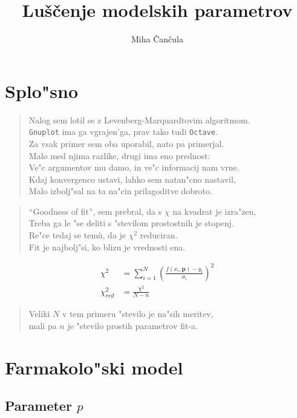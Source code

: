 \documentclass[a4paper,10pt]{article}
\title{Lu\v s\v cenje modelskih parametrov}
\author{Miha \v Can\v cula}
\begin{document}
\maketitle

\section{Splo"sno}
\begin{verse}
Nalog sem lotil se z Levenberg-Marquardtovim algoritmom. \\
\texttt{Gnuplot} ima ga vgrajen'ga, prav tako tudi \texttt{Octave}. \\
Za vsak primer sem oba uporabil, nato pa primerjal. \\
Malo med njima razlike, drugi ima eno prednost: \\
Ve"c argumentov mu damo, in ve"c informacij nam vrne. \\ 
Kdaj konvergenco ustavi, lahko sem natan"cno nastavil, \\
Malo izbolj"sal na ta na"cin prilagoditve dobroto. 
\end{verse}

\begin{verse}
 ``Goodness of fit'', sem prebral, da s $\chi$ na kvadrat je izra"zen, \\
Treba ga le "se deliti s "stevilom prostostnih je stopenj. \\
Re"ce tedaj se tem\`u, da je $\chi^2$ reduciran. \\
Fit je najbolj"si, ko blizu je vrednosti ena. \\
\end{verse}

\begin{align}
 \chi^2 &= \sum_{i=1}^N \left(\frac{f(x_i, \mathbf{p}) - y_i}{\sigma_i}\right)^2 \\
 \chi^2_{red} &= \frac{\chi^2}{N-n}
\end{align}

\begin{verse}
 Veliki $N$ v tem primeru "stevilo je na"sih meritev, \\
 mali pa $n$ je "stevilo prostih parametrov fit-a. 
\end{verse}

\section{Farmakolo"ski model}
\subsection{Parameter $p$}
\end{document}
